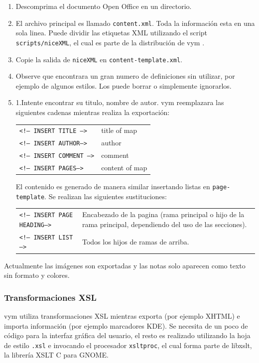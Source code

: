 \documentclass{article}
\newcommand{\vym}{{\sc vym }}
\begin{document}
\begin{appendix}
\begin{enumerate}
    \item Descomprima el documento Open Office en un directorio.

    \item El archivo principal es llamado {\tt content.xml}. Toda la informaci\'on esta en una sola linea. Puede dividir las etiquetas XML utilizando el script {\tt    scripts/niceXML}, el cual es parte de la distribuci\'on de \vym.

    \item Copie la salida de  {\tt niceXML} en {\tt content-template.xml}.

    \item Observe que encontrara un gran numero de definiciones sin utilizar, por ejemplo de algunos estilos. Los puede borrar o simplemente ignorarlos.

    \item 1.Intente encontrar su titulo, nombre de autor. \vym reemplazara las siguientes cadenas mientras realiza la exportaci\'on:
    \begin{center}
    \begin{tabular}{lp{4cm}}
        {\tt <!-- INSERT TITLE -->}     & title of map \\
        {\tt <!-- INSERT AUTHOR-->  }   & author \\
        {\tt <!-- INSERT COMMENT -->}   & comment \\
        {\tt <!-- INSERT PAGES-->}      & content of map \\
    \end{tabular}
    \end{center}
    El contenido es generado de manera similar insertando listas en {\tt page-template}. Se realizan las siguientes sustituciones:
    \begin{center}
    \begin{tabular}{lp{7cm}}
        {\tt <!-- INSERT PAGE HEADING-->}       & Encabezado de la pagina (rama principal o                                     hijo de la rama principal, dependiendo                          del uso de las secciones). \\
        {\tt <!-- INSERT LIST -->   }   & Todos los hijos de ramas de arriba. \\
    \end{tabular}
    \end{center}
\end{enumerate}
Actualmente las im\'agenes son exportadas y las notas solo aparecen como texto sin formato y colores.


\subsubsection*{Transformaciones XSL}
\vym utiliza transformaciones XSL mientras exporta (por ejemplo XHTML) e importa informaci\'on (por ejemplo marcadores KDE). Se necesita de un poco de c\'odigo para la interfaz gr\'afica del usuario, el resto es realizado utilizando la hoja de estilo {\tt .xsl} e invocando el procesador {\tt xsltproc}, el cual forma parte de libxslt, la librer\'ia XSLT C para GNOME.

\end{appendix}
\end{document}
